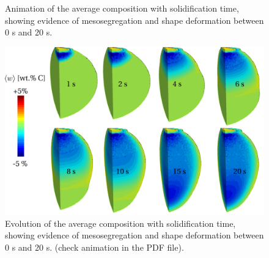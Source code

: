 \begin{figure}[htbp]
\centering
%
%
  {%
    \caption{Animation of the average composition with solidification time, showing evidence of mesosegregation and shape deformation between 0 s and 20 s.}
  }
  {%
    \includegraphics[width=1.0\textwidth]{Chapter5/Graphics/3d/bin/mesosegregation.pdf}
    \caption{Evolution of the average composition with solidification time, showing evidence of mesosegregation and shape deformation between 0 s and 20 s.
     (check animation in the PDF file).} 
  }
\label{fig:texus_mesosegregation}
\end{figure}

